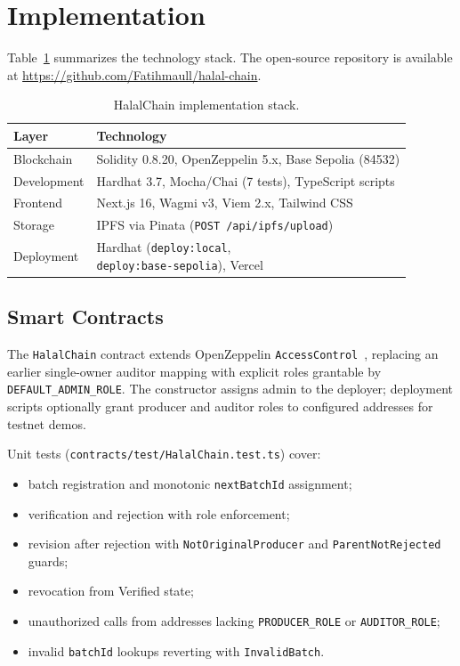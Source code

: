 \section{Implementation}
\label{sec:implementation}

Table~\ref{tab:stack} summarizes the technology stack.
The open-source repository is available at \url{https://github.com/Fatihmaull/halal-chain}.

\begin{table}[t]
  \caption{HalalChain implementation stack.}
  \label{tab:stack}
  \centering
  \footnotesize
  \setlength{\tabcolsep}{3pt}
  \begin{tabularx}{\columnwidth}{@{}>{\raggedright\arraybackslash}p{}X@{}}
    \toprule
    \textbf{Layer} & \textbf{Technology} \\
    \midrule
    Blockchain & Solidity 0.8.20, OpenZeppelin 5.x, Base Sepolia (84532) \\
    Development & Hardhat 3.7, Mocha/Chai (7 tests), TypeScript scripts \\
    Frontend & Next.js 16, Wagmi v3, Viem 2.x, Tailwind CSS \\
    Storage & IPFS via Pinata (\texttt{POST /api/ipfs/upload}) \\
    Deployment & \makecell[tl]{Hardhat (\texttt{deploy:local},\\\texttt{deploy:base-sepolia}), Vercel} \\
    \bottomrule
  \end{tabularx}
\end{table}

\subsection{Smart Contracts}
The \texttt{HalalChain} contract extends OpenZeppelin \texttt{AccessControl}~\cite{openzeppelin2024access}, replacing an earlier single-owner auditor mapping with explicit roles grantable by \texttt{DEFAULT\_ADMIN\_ROLE}.
The constructor assigns admin to the deployer; deployment scripts optionally grant producer and auditor roles to configured addresses for testnet demos.

Unit tests (\texttt{contracts/test/HalalChain.test.ts}) cover:
\begin{itemize}
  \item batch registration and monotonic \texttt{nextBatchId} assignment;
  \item verification and rejection with role enforcement;
  \item revision after rejection with \texttt{NotOriginalProducer} and \texttt{ParentNotRejected} guards;
  \item revocation from Verified state;
  \item unauthorized calls from addresses lacking \texttt{PRODUCER\_ROLE} or \texttt{AUDITOR\_ROLE};
  \item invalid \texttt{batchId} lookups reverting with \texttt{InvalidBatch}.
\end{itemize}


